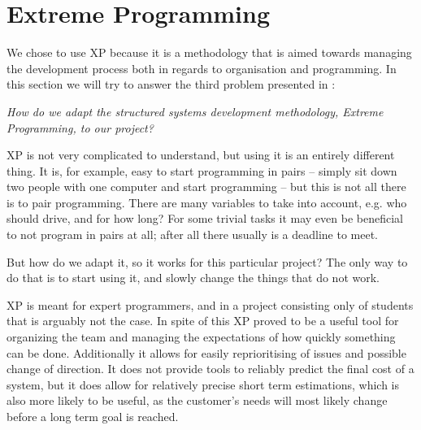 \section{Extreme Programming}
We chose to use XP because it is a methodology that is aimed towards managing the development process both in regards to organisation and programming. 
In this section we will try to answer the third problem presented in :
\begin{center}
	\textit{How do we adapt the structured systems development methodology, Extreme Programming, to our project?}
\end{center}

\noindent XP is not very complicated to understand, but using it is an entirely different thing. 
It is, for example, easy to start programming in pairs -- simply sit down two people with one computer and start programming -- but this is not all there is to pair programming. 
There are many variables to take into account, e.g. who should drive, and for how long? 
For some trivial tasks it may even be beneficial to not program in pairs at all; after all there usually is a deadline to meet.

But how do we adapt it, so it works for this particular project? 
The only way to do that is to start using it, and slowly change the things that do not work.



XP is meant for expert programmers, and in a project consisting only of students that is arguably not the case. 
In spite of this XP proved to be a useful tool for organizing the team and managing the expectations of how quickly something can be done. 
Additionally it allows for easily reprioritising of issues and possible change of direction. 
It does not provide tools to reliably predict the final cost of a system, but it does allow for relatively precise short term estimations, which is also more likely to be useful, as the customer's needs will most likely change before a long term goal is reached.

